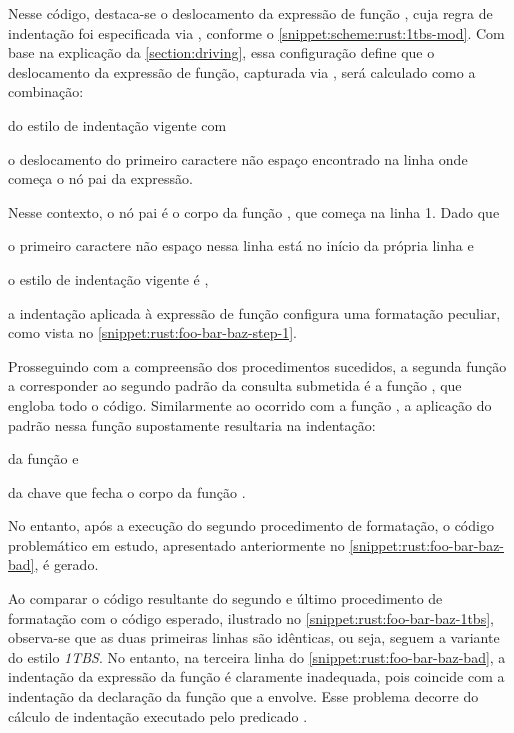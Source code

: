 \documentclass
  [11pt,a4paper,english,brazil,openright,sumario=tradicional,twoside]
  {abntex2}
\begin{document}
  Nesse código, destaca-se o deslocamento da expressão de função
  , cuja regra de indentação foi especificada
  via , conforme o
  \cref{snippet:scheme:rust:1tbs-mod}. Com base na explicação da
  \cref{section:driving}, essa configuração define que o deslocamento da
  expressão de função, capturada via , será calculado
  como a combinação:
  \begin{inparaenum}
    \item do estilo de indentação vigente com
    \item o deslocamento do primeiro caractere não espaço encontrado na linha
          onde começa o nó pai da expressão.
  \end{inparaenum}
  Nesse contexto, o nó pai é o corpo da função , que
  começa na linha 1. Dado que
  \begin{inparaenum}
    \item o primeiro caractere não espaço nessa linha está no início da própria
          linha e
    \item o estilo de indentação vigente é ,
  \end{inparaenum}
  a indentação aplicada à expressão de função 
  configura uma formatação peculiar, como vista no
  \cref{snippet:rust:foo-bar-baz-step-1}.

  Prosseguindo com a compreensão dos procedimentos sucedidos, a segunda função
  a corresponder ao segundo padrão da consulta submetida é a função
  , que engloba todo o código. Similarmente ao ocorrido
  com a função , a aplicação do padrão nessa função
  supostamente resultaria na indentação:
  \begin{inparaenum}
    \item da função  e
    \item da chave que fecha o corpo da função .
  \end{inparaenum}
  No entanto, após a execução do segundo procedimento de formatação, o código
  problemático em estudo, apresentado anteriormente no
  \cref{snippet:rust:foo-bar-baz-bad}, é gerado.

  Ao comparar o código resultante do segundo e último procedimento de
  formatação com o código esperado, ilustrado no
  \cref{snippet:rust:foo-bar-baz-1tbs}, observa-se que as duas primeiras linhas
  são idênticas, ou seja, seguem a variante do estilo \textit{1TBS}. No
  entanto, na terceira linha do \cref{snippet:rust:foo-bar-baz-bad}, a
  indentação da expressão da função  é
  claramente inadequada, pois coincide com a indentação da declaração da função
  que a envolve. Esse problema decorre do cálculo de indentação executado pelo
  predicado .
\end{document}
